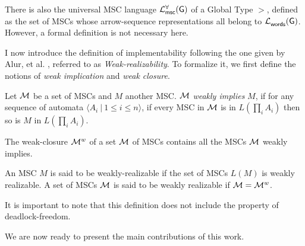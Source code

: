 There is also the universal MSC language $\mathcal{L}_{\mathsf{msc}}^{\forall}(\mathsf{G})$ 
of a Global Type $\gt$, defined as the set of MSCs whose arrow-sequence 
representations all belong to $\mathcal{L}_{\mathsf{words}}^{}(\mathsf{G})$. However, a formal 
definition is not necessary here. 


I now introduce the definition of implementability following the one given 
by Alur, et al. \cite{alur2005realizability}, referred to as 
\textit{Weak-realizability}.
To formalize it, we first define the notions of 
\textit{weak implication} and \textit{weak closure}.


\begin{definition}
	Let $\mathcal{M}$ be a set of MSCs and $M$ another MSC. $\mathcal{M}$
	\textit{weakly implies} $M$, if for any sequence of automata
	$\langle A_i \ |\ 1\leq i\leq n\rangle$, if every MSC in $\mathcal{M}$ is in
	$L(\prod_i A_i)$ then so is $M$ in $L(\prod_i A_i)$.
\end{definition}

\begin{definition}
	The weak-closure $\mathcal{M}^w$ of a set $\mathcal{M}$ of MSCs contains all the MSCs
	$\mathcal{M}$ weakly implies.
\end{definition}

\begin{definition}
	An MSC $M$ is said to be weakly-realizable if the set of MSCs
	$L(M)$ is weakly realizable. A set of MSCs $\mathcal{M}$ is said to be weakly
	realizable if $\mathcal{M}=\mathcal{M}^w$.
\end{definition}
It is important to note that this definition does not include the
property of deadlock-freedom. 



We are now ready to present the main contributions of this work.


